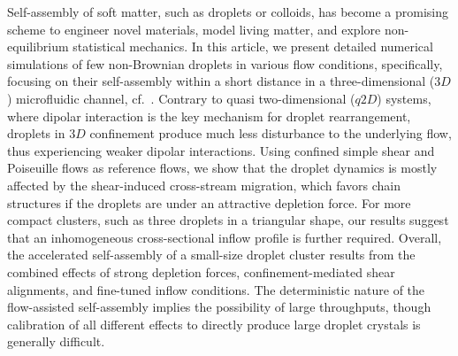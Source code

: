 \begin{paper}

\makepapertitle

%
\begin{paperabstract}
Self-assembly of soft matter, such as droplets or colloids, has become a promising scheme to engineer novel materials,
model living matter, and explore non-equilibrium statistical mechanics.
In this article, we present detailed numerical simulations of few non-Brownian droplets in various flow conditions,
specifically, focusing on their self-assembly within a short distance in a three-dimensional ($3D$) microfluidic channel, cf.\ \cite{tabeling}.
Contrary to quasi two-dimensional ($q2D$) systems, where dipolar interaction is the key mechanism for droplet rearrangement,
droplets in $3D$ confinement produce much less disturbance to the underlying flow, thus experiencing weaker dipolar interactions.
Using confined simple shear and Poiseuille flows as reference flows,
we show that the droplet dynamics is mostly affected by the shear-induced cross-stream migration,
which favors chain structures if the droplets are under an attractive depletion force.
For more compact clusters, such as three droplets in a triangular shape,
our results suggest that an inhomogeneous cross-sectional inflow profile is further required.
Overall, the accelerated self-assembly of a small-size droplet cluster results from the combined effects of
strong depletion forces, confinement-mediated shear alignments, and fine-tuned inflow conditions.
The deterministic nature of the flow-assisted self-assembly implies the possibility of large throughputs,
though calibration of all different effects to directly produce large droplet crystals is generally difficult.
\end{paperabstract}


%



%
\clearpage


%

\end{paper}
